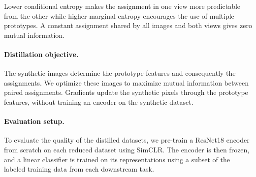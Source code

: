 Lower conditional entropy makes the assignment in one view more predictable from the other while higher marginal entropy encourages the use of multiple prototypes. A constant assignment shared by all images and both views gives zero mutual information.

\paragraph{Distillation objective.}
The synthetic images determine the prototype features and consequently the assignments. We optimize these images to maximize mutual information between paired assignments. Gradients update the synthetic pixels through the prototype features, without training an encoder on the synthetic dataset.

\paragraph{Evaluation setup.}
To evaluate the quality of the distilled datasets, we pre-train a ResNet18 encoder from scratch on each reduced dataset using SimCLR. The encoder is then frozen, and a linear classifier is trained on its representations using a subset of the labeled training data from each downstream task.
